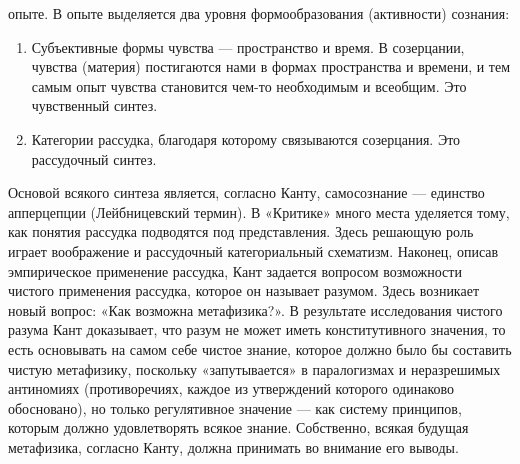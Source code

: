 \documentclass[12pt]{article}
\begin{document}
опыте. В опыте выделяется два уровня формообразования (активности) сознания:
\begin{enumerate}
\item Субъективные формы
	чувства — пространство и время. В созерцании, чувства (материя) постигаются нами в формах пространства и
	времени, и тем самым опыт чувства становится чем-то необходимым и всеобщим. Это чувственный синтез.
\item Категории рассудка, благодаря которому связываются созерцания. Это рассудочный синтез.
\end{enumerate}
Основой всякого
синтеза  является,  согласно  Канту,  самосознание  —  единство  апперцепции  (Лейбницевский  термин).  В
«Критике» много места уделяется тому, как понятия рассудка подводятся под представления. Здесь решающую
роль играет воображение и рассудочный категориальный схематизм. Наконец, описав эмпирическое применение
рассудка, Кант задается вопросом возможности чистого применения рассудка, которое он называет разумом.
Здесь возникает новый вопрос: «Как возможна метафизика?». В результате исследования чистого разума Кант
доказывает, что разум не может иметь конститутивного значения, то есть основывать на самом себе чистое
знание, которое должно было бы составить чистую метафизику, поскольку «запутывается» в паралогизмах и
неразрешимых антиномиях (противоречиях, каждое из утверждений которого одинаково обосновано), но только
регулятивное значение — как систему принципов, которым должно удовлетворять всякое знание. Собственно,
всякая будущая метафизика, согласно Канту, должна принимать во внимание его выводы.
\end{document}

